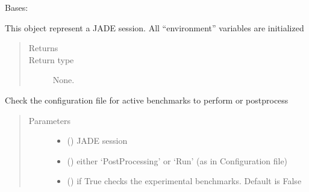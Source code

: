 \documentclass[letterpaper,10pt,english]{sphinxmanual}
\begin{document}
\begin{fulllineitems}
\label{\detokenize{api/initobjects:main.Session}}
\sphinxAtStartPar
Bases: 

\sphinxAtStartPar
This object represent a JADE session. All “environment” variables are
initialized
\begin{quote}\begin{description}
\item[{Returns}] \leavevmode
\sphinxAtStartPar


\item[{Return type}] \leavevmode
\sphinxAtStartPar
None.

\end{description}\end{quote}

\begin{fulllineitems}
\label{\detokenize{api/initobjects:main.Session.check_active_tests}}
\sphinxAtStartPar
Check the configuration file for active benchmarks to perform or
post\sphinxhyphen{}process
\begin{quote}\begin{description}
\item[{Parameters}] \leavevmode\begin{itemize}
\item {} 
\sphinxAtStartPar
{} ({\hyperref[\detokenize{api/initobjects:main.Session}]{}}) \textendash{} JADE session

\item {} 
\sphinxAtStartPar
{} () \textendash{} either ‘Post\sphinxhyphen{}Processing’ or ‘Run’ (as in Configuration file)

\item {} 
\sphinxAtStartPar
{} () \textendash{} if True checks the experimental benchmarks. Default is False


\end{itemize}
\end{description}
\end{quote}
\end{fulllineitems}
\end{fulllineitems}
\end{document}
